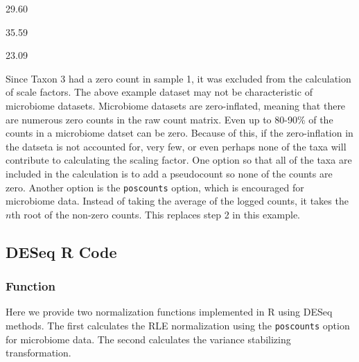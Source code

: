 \documentclass[
]{book}
\begin{document}
29.60

35.59

23.09

Since Taxon 3 had a zero count in sample 1, it was excluded from the calculation of scale factors. The above example dataset may not be characteristic of microbiome datasets. Microbiome datasets are zero-inflated, meaning that there are numerous zero counts in the raw count matrix. Even up to 80-90\% of the counts in a microbiome datset can be zero. Because of this, if the zero-inflation in the datseta is not accounted for, very few, or even perhaps none of the taxa will contribute to calculating the scaling factor. One option so that all of the taxa are included in the calculation is to add a pseudocount so none of the counts are zero. Another option is the \texttt{poscounts} option, which is encouraged for microbiome data. Instead of taking the average of the logged counts, it takes the \(n\)th root of the non-zero counts. This replaces step 2 in this example.

\hypertarget{deseq-r-code}{%
\subsection{DESeq R Code}\label{deseq-r-code}}

\hypertarget{function-2}{%
\subsubsection{Function}\label{function-2}}

Here we provide two normalization functions implemented in R using DESeq methods. The first calculates the RLE normalization using the \texttt{poscounts} option for microbiome data. The second calculates the variance stabilizing transformation.
\end{document}
